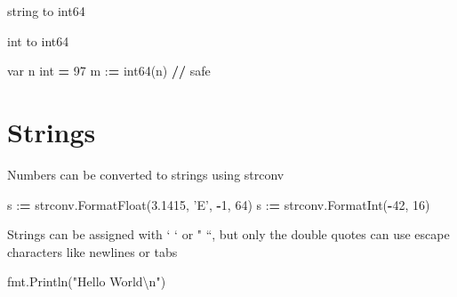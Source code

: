 \documentclass[]{book}
\newenvironment{Shaded}{\begin{snugshade}}{\end{snugshade}}
\newcommand{\DecValTok}[1]{\textcolor[rgb]{0.00,0.00,0.81}{#1}}
\newcommand{\FloatTok}[1]{\textcolor[rgb]{0.00,0.00,0.81}{#1}}
\newcommand{\CharTok}[1]{\textcolor[rgb]{0.31,0.60,0.02}{#1}}
\newcommand{\SpecialCharTok}[1]{\textcolor[rgb]{0.00,0.00,0.00}{#1}}
\newcommand{\StringTok}[1]{\textcolor[rgb]{0.31,0.60,0.02}{#1}}
\newcommand{\ControlFlowTok}[1]{\textcolor[rgb]{0.13,0.29,0.53}{\textbf{#1}}}
\newcommand{\OperatorTok}[1]{\textcolor[rgb]{0.81,0.36,0.00}{\textbf{#1}}}
\newcommand{\BuiltInTok}[1]{#1}
\newcommand{\NormalTok}[1]{#1}
\begin{document}
string to int64

\begin{Shaded}
\end{Shaded}

int to int64

\begin{Shaded}
\begin{Highlighting}[]
\NormalTok{var n }\BuiltInTok{int} \OperatorTok{=} \DecValTok{97}
\NormalTok{m :}\OperatorTok{=}\NormalTok{ int64(n) }\OperatorTok{//}\NormalTok{ safe}
\end{Highlighting}
\end{Shaded}

\section{Strings}\label{strings}

Numbers can be converted to strings using strconv

\begin{Shaded}
\begin{Highlighting}[]
\NormalTok{s :}\OperatorTok{=}\NormalTok{ strconv.FormatFloat(}\FloatTok{3.1415}\NormalTok{, }\StringTok{'E'}\NormalTok{, }\OperatorTok{-}\DecValTok{1}\NormalTok{, }\DecValTok{64}\NormalTok{)}
\NormalTok{s :}\OperatorTok{=}\NormalTok{ strconv.FormatInt(}\OperatorTok{-}\DecValTok{42}\NormalTok{, }\DecValTok{16}\NormalTok{)}
\end{Highlighting}
\end{Shaded}

Strings can be assigned with ` ` or " ``, but only the double quotes can
use escape characters like newlines or tabs

\begin{Shaded}
\begin{Highlighting}[]
\NormalTok{fmt.Println(}\StringTok{"Hello World}\CharTok{\textbackslash{}n}\StringTok{"}\NormalTok{)}
\end{Highlighting}
\end{Shaded}
\end{document}
